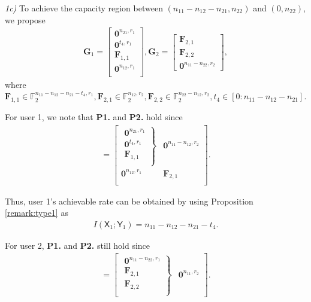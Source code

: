 \documentclass[12pt, draftclsnofoot, onecolumn]{IEEEtran}
\newcommand{\msf}[1]{\mathsf{#1}}
\theoremstyle{definition}
\begin{document}
\emph{1c) }To achieve the capacity region between $(n_{11}-n_{12}-n_{21},n_{22})$ and $(0,n_{22})$, we propose
\begin{align}
\boldsymbol{G}_1 = \begin{bmatrix}
\boldsymbol{0}^{n_{21},r_1} \\
\boldsymbol{0}^{t_4,r_1} \\
\boldsymbol{F}_{1,1}\\
\boldsymbol{0}^{n_{12} ,r_1}\\
\end{bmatrix},
\boldsymbol{G}_2 = \begin{bmatrix}
\boldsymbol{F}_{2,1}\\
\boldsymbol{F}_{2,2}\\
\boldsymbol{0}^{n_{11}-n_{22},r_2}
\end{bmatrix},
\end{align}
where $\boldsymbol{F}_{1,1}\in\mathbb{F}_2^{n_{11}-n_{12}-n_{21}-t_4,r_1},\boldsymbol{F}_{2,1}\in\mathbb{F}_2^{n_{12},r_2},\boldsymbol{F}_{2,2}\in\mathbb{F}_2^{n_{22} - n_{12},r_2},t_4 \in[0:n_{11} - n_{12} - n_{21} ]$.






For user 1, we note that {\bf P1.} and {\bf P2.} hold since
\begin{align}
[\boldsymbol{A}_1\boldsymbol{G}_1 \; \boldsymbol{B}_1\boldsymbol{G}_2] =\begin{bmatrix}
\left. {\begin{array}{*{20}{c}}
\boldsymbol{0}^{n_{21},r_1}  \\
\boldsymbol{0}^{t_4,r_1} \\
\boldsymbol{F}_{1,1}   \\
 \end{array}} \right\}& \boldsymbol{0}^{n_{11} - n_{12},r_2} \\
\boldsymbol{0}^{n_{12} ,r_1} & \boldsymbol{F}_{2,1}\\
\end{bmatrix}.
\end{align}


Thus, user 1's achievable rate can be obtained by using Proposition \ref{remark:type1} as
\begin{align}
I(\msf{X}_1;\msf{Y}_1) = n_{11}-n_{12}-n_{21} - t_4.
\end{align}

For user 2, {\bf P1.} and {\bf P2.} still hold since
\begin{align}
[\boldsymbol{A}_2\boldsymbol{G}_2 \; \boldsymbol{B}_2\boldsymbol{G}_1] =\begin{bmatrix}
\left. {\begin{array}{*{20}{c}}
\boldsymbol{0}^{n_{11}-n_{22},r_1} \\
\boldsymbol{F}_{2,1}\\
\boldsymbol{F}_{2,2}\\
\end{array}} \right\} & \boldsymbol{0}^{n_{11},r_2}
\end{bmatrix}.
\end{align}
\end{document}
